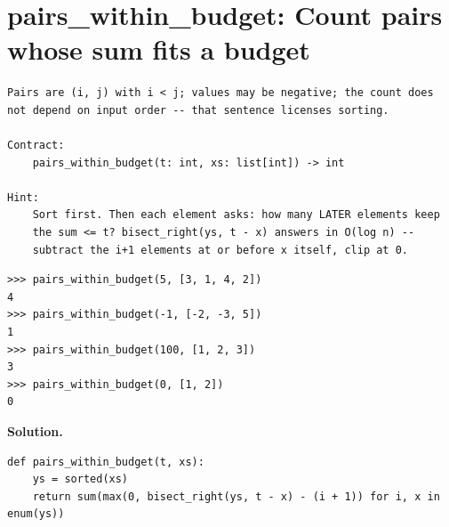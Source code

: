 \documentclass[10pt,letterpaper]{book}
\begin{document}
\section{pairs\_within\_budget: Count pairs whose sum fits a budget}
\begin{lstlisting}[style=ex]
Pairs are (i, j) with i < j; values may be negative; the count does
not depend on input order -- that sentence licenses sorting.

Contract:
    pairs_within_budget(t: int, xs: list[int]) -> int

Hint:
    Sort first. Then each element asks: how many LATER elements keep
    the sum <= t? bisect_right(ys, t - x) answers in O(log n) --
    subtract the i+1 elements at or before x itself, clip at 0.
\end{lstlisting}
\begin{lstlisting}[style=ex]
>>> pairs_within_budget(5, [3, 1, 4, 2])
4
>>> pairs_within_budget(-1, [-2, -3, 5])
1
>>> pairs_within_budget(100, [1, 2, 3])
3
>>> pairs_within_budget(0, [1, 2])
0
\end{lstlisting}
\noindent\textbf{Solution.}
\begin{lstlisting}[style=code]
def pairs_within_budget(t, xs):
    ys = sorted(xs)
    return sum(max(0, bisect_right(ys, t - x) - (i + 1)) for i, x in enum(ys))
\end{lstlisting}
\end{document}
